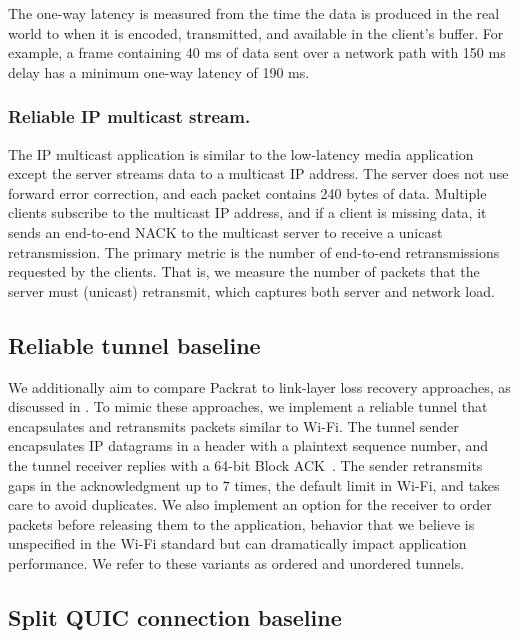 The one-way latency is measured from the time the data is produced in the real
world to when it is encoded, transmitted, and available in the client's
buffer. For example, a frame containing 40 ms of data sent over a network path
with 150 ms delay has a minimum one-way latency of 190 ms.

\subsubsection{Reliable IP multicast stream.}

The IP multicast application is similar to the low-latency media application
except the server streams data to a multicast IP address. The server does not
use forward error correction, and each packet contains 240 bytes of data. Multiple clients
subscribe to the multicast IP address, and if a client is missing data,
it sends an end-to-end NACK to the
multicast server to receive a unicast retransmission.
The primary metric is the number of end-to-end retransmissions requested by
the clients. That is, we measure the number of packets that the server
must (unicast) retransmit, which captures both server and network load.

\subsection{Reliable tunnel baseline}
\label{sec:packrat:implementation:tunnel}

We additionally aim to compare Packrat to link-layer loss recovery approaches,
as discussed in . To mimic these approaches, we
implement a reliable tunnel that encapsulates and retransmits packets similar
to Wi-Fi. The tunnel sender encapsulates IP datagrams in a header with a
plaintext sequence number, and the tunnel receiver replies with a 64-bit Block
ACK~\cite{ieee80211e}. The sender retransmits gaps in the acknowledgment up to
$7$ times, the default limit in Wi-Fi, and takes care to avoid duplicates. We
also implement an option for the receiver to order packets before releasing
them to the application, behavior that we believe is unspecified in the Wi-Fi
standard but can dramatically impact application performance. We refer to these
variants as ordered and unordered tunnels.

\subsection{Split QUIC connection baseline}
\label{sec:packrat:implementation:split-quic}

